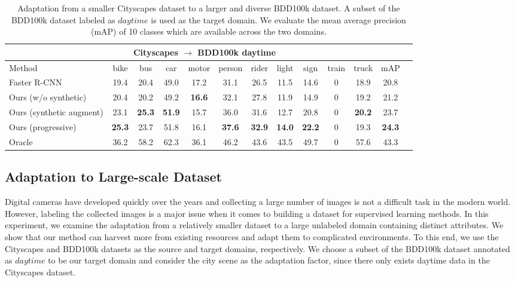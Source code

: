 \documentclass[10pt,twocolumn,letterpaper]{article}
\begin{document}
\begin{table*}[t]
\begin{center}
\caption{
Adaptation from a smaller Cityscapes dataset to a larger and diverse BDD100k dataset.
A subset of the BDD100k dataset labeled as $daytime$ is used as the target domain. 
We evaluate the mean average precision (mAP) of 10 classes which are available across the two domains.
}
\vspace{1mm}
\label{tab:C_B}
\begin{tabular}{lcccccccccccc}
                \toprule
                \multicolumn{12}{c}{Cityscapes $\rightarrow$ BDD100k daytime} \\
                \midrule
                Method & bike & bus & car & motor & person & rider & light & sign & train & truck & mAP \\
                \midrule
                Faster R-CNN & 19.4& 20.4& 49.0& 17.2& 31.1& 26.5& 11.5& 14.6& 0& 18.9& 20.8\\
                \midrule
                Ours (w/o synthetic) & 20.4& 20.2& 49.2& \textbf{16.6}& 32.1& 27.8& 11.9& 14.9& 0& 19.2& 21.2\\
                Ours (synthetic augment) & 23.1& \textbf{25.3}& \textbf{51.9}& 15.7& 36.0& 31.6& 12.7& 20.8& 0& \textbf{20.2}& 23.7 \\
                Ours (progressive) & \textbf{25.3}& 23.7& 51.8& 16.1& \textbf{37.6}& \textbf{32.9}& \textbf{14.0}& \textbf{22.2}& 0& 19.3& \textbf{24.3}\\        
			   \midrule
			   Oracle & 36.2& 58.2& 62.3& 36.1& 46.2& 43.6& 43.5& 49.7& 0& 57.6& 43.3\\
			  \bottomrule
			   
\end{tabular}
\end{center}
\vspace{-1mm}
\end{table*}





\subsection{Adaptation to Large-scale Dataset} \label{largescale}
Digital cameras have developed quickly over the years and collecting a large number of images is not a difficult task in the modern world.
However, labeling the collected images is a major issue when it comes to building a dataset for supervised learning methods.
In this experiment, we examine the adaptation from a relatively smaller dataset to a large unlabeled domain containing distinct attributes.
We show that our method can harvest more from existing resources and adapt them to complicated environments.
To this end, we use the Cityscapes \cite{Cordts2016Cityscapes} and BDD100k \cite{Yu2018BDD100KAD} datasets as the source and target domains, respectively.
We choose a subset of the BDD100k dataset annotated as $daytime$ to be our target domain and consider the city scene as the adaptation factor, since there only exists daytime data in the Cityscapes dataset.
\end{document}
